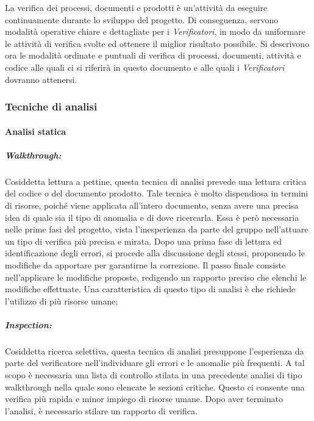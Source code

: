La verifica dei processi, documenti e prodotti è un'attività da eseguire continuamente durante lo sviluppo del progetto. Di conseguenza, servono modalità operative chiare e dettagliate per i \textit{Verificatori}, in modo da uniformare le attività di verifica svolte ed ottenere il miglior risultato possibile. Si descrivono ora le modalità ordinate e puntuali di verifica di processi, documenti, attività e codice alle quali ci si riferirà in questo documento e alle quali i \textit{Verificatori} dovranno attenersi.

\subsubsection{Tecniche di analisi}

	\paragraph{Analisi statica}
		\subparagraph{Walkthrough:}
Cosiddetta lettura a pettine, questa tecnica di analisi prevede una lettura critica del codice o del documento prodotto. Tale tecnica è molto dispendiosa in termini di risorse, poiché viene applicata all'intero documento, senza avere una precisa idea di quale sia il tipo di anomalia e di dove ricercarla. Essa è però necessaria nelle prime fasi del progetto, vista l'inesperienza da parte del gruppo nell'attuare un tipo di verifica più precisa e mirata. Dopo una prima fase di lettura ed identificazione degli errori, si procede alla discussione degli stessi, proponendo le modifiche da apportare per garantirne la correzione. Il passo finale consiste nell'applicare le modifiche proposte, redigendo un rapporto preciso che elenchi le modifiche effettuate. Una caratteristica di questo tipo di analisi è che richiede l'utilizzo di più risorse umane;
	\subparagraph{Inspection:}
Cosiddetta ricerca selettiva, questa tecnica di analisi presuppone l'esperienza da parte del verificatore nell'individuare gli errori e le anomalie più frequenti. A tal scopo è necessaria una lista di controllo stilata in una precedente analisi di tipo \gls{walkthrough} nella quale sono elencate le sezioni critiche. Questo ci consente una verifica più rapida e minor impiego di risorse umane. Dopo aver terminato l'analisi, è necessario stilare un rapporto di verifica.

